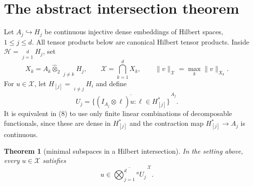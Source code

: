 \documentclass[11pt]{article}
\newtheorem{theorem}{Theorem}
\newcommand{\cX}{\mathcal X}
\newcommand{\cH}{\mathcal H}
\newcommand{\clos}[1]{\overline{#1}}
\newcommand{\hot}{\widehat\otimes_2}
\newcommand{\HT}{\mathop{\widehat\bigotimes}\limits}
\begin{document}
\section{The abstract intersection theorem}

Let $A_j\hookrightarrow H_j$ be continuous injective dense embeddings of
Hilbert spaces, $1\leq j\leq d$.  All tensor products below are canonical
Hilbert tensor products.  Inside
$\cH=\HT_{j=1}^d H_j$, set
\[
 X_k=A_k\hot\HT_{j\ne k}H_j,
 \qquad
 \cX=\bigcap_{k=1}^dX_k,
 \qquad
 \|v\|_{\cX}=\max_k\|v\|_{X_k}.
 \tag{7}
\]
For $u\in\cX$, let $H_{[j]}=\HT_{i\ne j}H_i$ and define
\[
 U_j=\clos{\{(I_{A_j}\otimes\ell)u:
                \ell\in H_{[j]}^*\}}^{\,A_j}.
 \tag{8}
\]
It is equivalent in (8) to use only finite linear combinations of
decomposable functionals, since these are dense in $H_{[j]}^*$ and the
contraction map $H_{[j]}^*\to A_j$ is continuous.

\begin{theorem}[minimal subspaces in a Hilbert intersection]\label{thm:abstract}
In the setting above, every $u\in\cX$ satisfies
\[
 u\in\clos{\bigotimes_{j=1}^d{}^{a}U_j}^{\,\cX}.
 \tag{9}
\]
\end{theorem}
\end{document}
